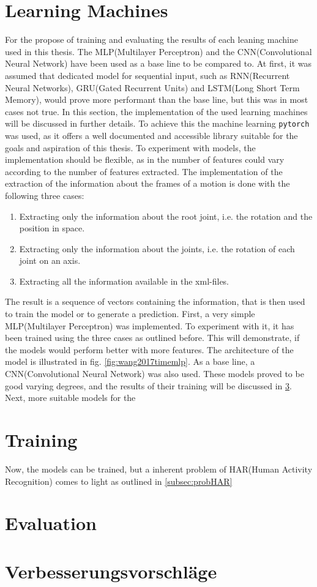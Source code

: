 \section{Learning Machines}
\label{section:learningmachines}
For the propose of training and evaluating the results of each leaning machine used in this thesis. The MLP(Multilayer Perceptron) and the CNN(Convolutional Neural Network) have been used as a base line to be compared to. At first, it was assumed that dedicated model for sequential input, such as RNN(Recurrent Neural Networks), GRU(Gated Recurrent Units) and LSTM(Long Short Term Memory), would prove more performant than the base line, but this was in most cases not true. In this section, the implementation of the used learning machines will be discussed in further details. To achieve this the machine learning \texttt{pytorch} was used, as it offers a well documented and accessible library suitable for the goals and aspiration of this thesis. To experiment with models, the implementation should be flexible, as in the number of features could vary according to the number of features extracted. The implementation of the extraction of the information about the frames of a motion is done with the following three cases:
\begin{enumerate}
	\item Extracting only the information about the root joint, i.e. the rotation and the position in space.
	\item Extracting only the information about the joints, i.e. the rotation of each joint on an axis.
	\item Extracting all the information available in the xml-files.
\end{enumerate}
The result is a sequence of vectors containing the information, that is then used to train the model or to generate a prediction.\newline
First, a very simple MLP(Multilayer Perceptron) was implemented. To experiment with it, it has been trained using the three cases as outlined before. This will demonstrate, if the models would perform better with more features. The architecture of the model is illustrated in fig. \ref{fig:wang2017timemlp}. As a base line, a CNN(Convolutional Neural Network) was also used. These models proved to be good varying degrees, and the results of their training will be discussed in \ref{sec:evaluation}. Next, more suitable models for the 
\section{Training}\label{section:training}
Now, the models can be trained, but a inherent problem of HAR(Human Activity Recognition) comes to light as outlined in \ref{subsec:probHAR}
\section{Evaluation}\label{sec:evaluation}
\section{Verbesserungsvorschläge}
